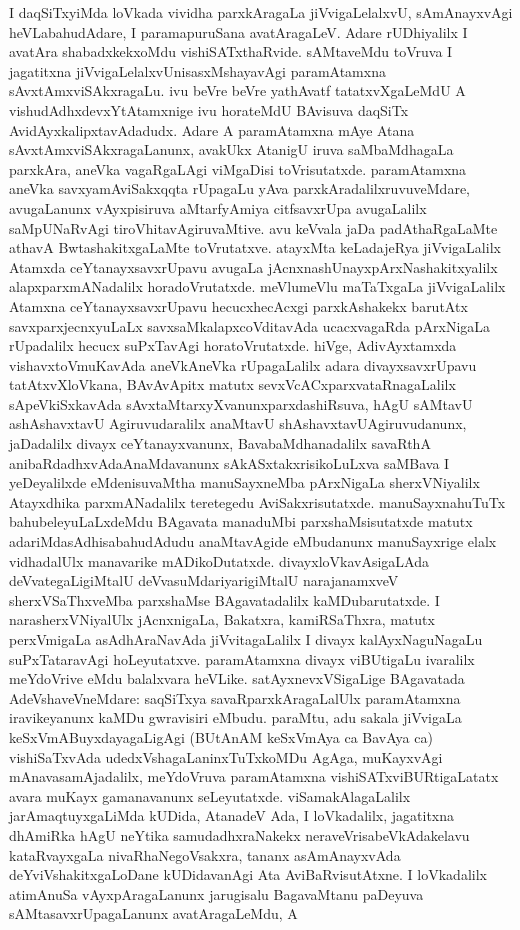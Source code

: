 I daqSiTxyiMda loVkada vividha parxkAragaLa jiVvigaLelalxvU, sAmAnayxvAgi heVLa\-bahudAdare, I paramapuruSana avatAragaLeV. Adare rUDhiyalilx I avatAra shabadxkekx\break oMdu vishiSATxthaRvide. sAMtaveMdu toVruva I jagatitxna jiVvigaLelalxvU\break nisasxMshayavAgi paramAtamxna sAvxtAmxviSAkxragaLu. ivu beVre beVre yathAvatf tatatxvX\-gaLeMdU A vishudAdhxdevxYtAtamxnige ivu horateMdU BAvisuva daqSiTx AvidAyxkalipxta\-vAdadudx. Adare A paramAtamxna mAye Atana sAvxtAmxviSAkxragaLanunx, avakUkx Ata\-nigU iruva saMbaMdhagaLa parxkAra, aneVka vagaRgaLAgi viMgaDisi toVrisutatxde. para\-mAtamxna aneVka savxyamAviSakxqqta rUpagaLu yAva parxkAradalilxruvuveMdare, avu\-gaLanunx vAyxpisiruva aMtarfyAmiya citfsavxrUpa avugaLalilx saMpUNaRvAgi tiroVhita\-vAgiruvaMtive. avu keVvala jaDa padAthaRgaLaMte athavA BwtashakitxgaLaMte toVru\-tatxve. atayxMta keLadajeRya jiVvigaLalilx Atamxda ceYtanayxsavxrUpavu avugaLa jAcnxnashUnayx\break pArxNashakitxyalilx alapxparxmANadalilx horadoVrutatxde. meVlumeVlu maTaTxgaLa jiVvi\-gaLalilx Atamxna ceYtanayxsavxrUpavu hecucxhecAcxgi parxkAshakekx barutAtx savxparxjecnxyuLaLx savxsaMkalapx\-coVdita\-vAda ucacxvagaRda pArxNigaLa rUpadalilx hecucx suPxTavAgi horatoVrutatxde. hiVge, A\break divAyxtamxda vishavxtoVmuKavAda aneVkAneVka rUpagaLalilx adara divayxsavxrUpavu tatAtxvX\-loVkana, BAvAvApitx matutx sevxVcACxparxvataRnagaLalilx sApeVkiSxkavAda sAvxtaMtarxyXvanunx\break parxdashiRsuva, hAgU sAMtavU ashAshavxtavU Agiruvudaralilx anaMtavU shAshavxtavU\break Agiruvudanunx, jaDadalilx divayx ceYtanayxvanunx, BavabaMdhanadalilx savaRthA anibaRdadhxvAda\break AnaMdavanunx sAkASxtakxrisikoLuLxva saMBava I yeDeyalilxde eMdenisuvaMtha manuSayx\-neMba pArxNigaLa sherxVNiyalilx Atayxdhika parxmANadalilx teretegedu AviSakxrisutatxde. manuSayxna\break huTuTx bahubeleyuLaLxdeMdu BAgavata manaduMbi parxshaMsisutatxde matutx adariMda\break sAdhisabahudAdudu anaMtavAgide eMbudanunx manuSayxrige elalx vidhadalUlx mana\-varike mADikoDutatxde. divayxloVkavAsigaLAda deVvategaLigiMtalU deVvasuMdari\-yari\-giMtalU narajanamxveV sherxVSaThxveMba parxshaMse BAgavatadalilx kaMDubarutatxde. I nara\-sherxVNi\-yalUlx jAcnxnigaLa, Bakatxra, kamiRSaThxra, matutx perxVmigaLa asAdhAraNavAda jiVvitagaLalilx I divayx kalAyxNaguNagaLu suPxTataravAgi hoLeyutatxve. paramAtamxna divayx viBUti\-gaLu ivaralilx meYdoVrive eMdu balalxvara heVLike. satAyxnevxVSigaLige BAgavatada AdeVsha\-veVneMdare: saqSiTxya savaRparxkAragaLalUlx paramAtamxna iravikeyanunx kaMDu gwravisiri eMbudu. paraMtu, adu sakala jiVvigaLa keSxVmABuyxdayagaLigAgi (BUtAnAM keSxVmAya ca BavAya ca) vishiSaTxvAda udedxVshagaLaninxTuTxkoMDu AgAga, muKayx\-vAgi mAnavasamAjadalilx, meYdoVruva paramAtamxna vishiSATxviBURtigaLatatx avara muKayx gamanavanunx seLeyutatxde. viSamakAlagaLalilx jarAmaqtuyxgaLiMda kUDida, AtanadeV Ada, I loVkadalilx, jagatitxna dhAmiRka hAgU neYtika samudadhxraNakekx neraveVrisabeVkAda\break kelavu kataRvayxgaLa nivaRhaNegoVsakxra, tananx asAmAnayxvAda deYviVshakitxgaLoDane kUDi\-davanAgi Ata AviBaRvisutAtxne. I loVkadalilx atimAnuSa vAyxpAragaLanunx jarugi\-salu BagavaMtanu paDeyuva sAMtasavxrUpagaLanunx avatAragaLeMdu, A 